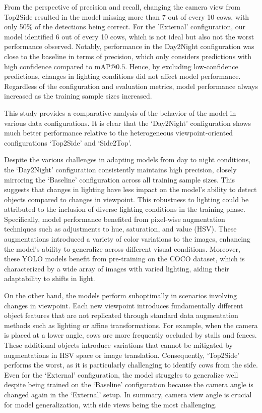 From the perspective of precision and recall, changing the camera view from Top2Side resulted in the model missing more than 7 out of every 10 cows, with only 50\% of the detections being correct. For the 'External' configuration, our model identified 6 out of every 10 cows, which is not ideal but also not the worst performance observed. Notably, performance in the Day2Night configuration was close to the baseline in terms of precision, which only considers predictions with high confidence compared to $\text{mAP@{0.5}}$. Hence, by excluding low-confidence predictions, changes in lighting conditions did not affect model performance. Regardless of the configuration and evaluation metrics, model performance always increased as the training sample sizes increased.

This study provides a comparative analysis of the behavior of the model in various data configurations. It is clear that the `Day2Night' configuration shows much better performance relative to the heterogeneous viewpoint-oriented configurations `Top2Side' and `Side2Top'.

Despite the various challenges in adapting models from day to night conditions, the `Day2Night' configuration consistently maintains high precision, closely mirroring the `Baseline' configuration across all training sample sizes. This suggests that changes in lighting have less impact on the model's ability to detect objects compared to changes in viewpoint. This robustness to lighting could be attributed to the inclusion of diverse lighting conditions in the training phase. Specifically, model performance benefited from pixel-wise augmentation techniques such as adjustments to hue, saturation, and value (HSV). These augmentations introduced a variety of color variations to the images, enhancing the model's ability to generalize across different visual conditions. Moreover, these YOLO models benefit from pre-training on the COCO dataset, which is characterized by a wide array of images with varied lighting, aiding their adaptability to shifts in light.

On the other hand, the models perform suboptimally in scenarios involving changes in viewpoint. Each new viewpoint introduces fundamentally different object features that are not replicated through standard data augmentation methods such as lighting or affine transformations. For example, when the camera is placed at a lower angle, cows are more frequently occluded by stalls and fences. These additional objects introduce variations that cannot be mitigated by augmentations in HSV space or image translation. Consequently, `Top2Side' performs the worst, as it is particularly challenging to identify cows from the side. Even for the `External' configuration, the model struggles to generalize well despite being trained on the `Baseline' configuration because the camera angle is changed again in the `External' setup. In summary, camera view angle is crucial for model generalization, with side views being the most challenging.

